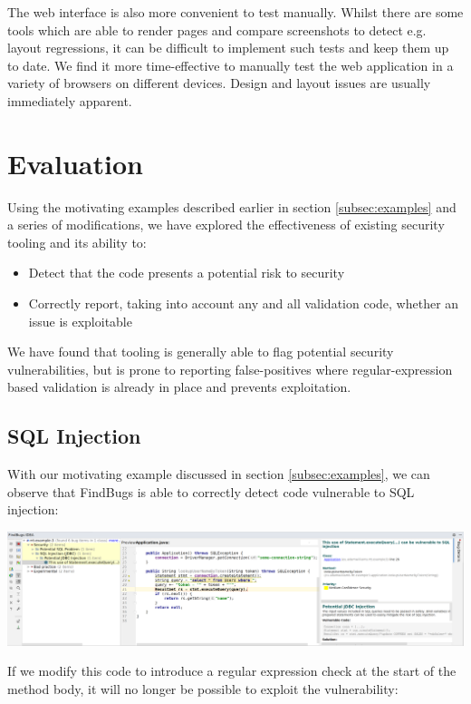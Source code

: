 \documentclass[a4paper,openany,12pt]{book}
\begin{document}
The web interface is also more convenient to test manually.
Whilst there are some tools which are able to render pages and compare screenshots to detect e.g. layout regressions, it can be difficult to implement such tests and keep them up to date.
We find it more time-effective to manually test the web application in a variety of browsers on different devices.
Design and layout issues are usually immediately apparent.


\chapter{Evaluation}

Using the motivating examples described earlier in section \ref{subsec:examples} and a series of modifications,
we have explored the effectiveness of existing security tooling and its ability to:

\begin{itemize}
    \item Detect that the code presents a potential risk to security
    \item Correctly report, taking into account any and all validation code, whether an issue is exploitable
\end{itemize}

We have found that tooling is generally able to flag potential security vulnerabilities, but is prone to reporting
false-positives where regular-expression based validation is already in place and prevents exploitation.

\section{SQL Injection}

With our motivating example discussed in section \ref{subsec:examples}, we can observe that FindBugs is able
to correctly detect code vulnerable to SQL injection:

\includegraphics[width=\linewidth]{findbugs-eval.png}

If we modify this code to introduce a regular expression check at the start of the method body, it will no longer
be possible to exploit the vulnerability:
\end{document}
